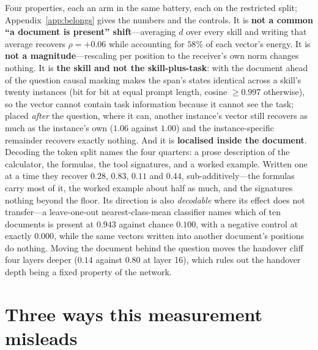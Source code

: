 \documentclass{article}
\newcommand{\dvec}{\ensuremath{d}}
\begin{document}
Four properties, each an arm in the same battery, each on the restricted split;
Appendix~\ref{app:belongs} gives the numbers and the controls. It is
\textbf{not a common ``a document is present'' shift}---averaging $\dvec$ over
every skill and writing that average recovers $\rho=+0.06$ while accounting for
$58\%$ of each vector's energy. It is \textbf{not a magnitude}---rescaling per
position to the receiver's own norm changes nothing. It is \textbf{the skill and
not the skill-plus-task}: with the document ahead of the question causal masking
makes the span's states identical across a skill's twenty instances (bit for bit
at equal prompt length, cosine $\ge 0.997$ otherwise), so the vector cannot contain task
information because it cannot see the task; placed \emph{after} the question,
where it can, another instance's vector still recovers as much as the instance's
own ($1.06$ against $1.00$) and the instance-specific remainder recovers exactly
nothing. And it is \textbf{localised inside the document}. Decoding the token split
names the four quarters: a prose description of the calculator, the formulas,
the tool signatures, and a worked example. Written one at a time they recover
$0.28$, $\mathbf{0.83}$, $0.11$ and $0.44$, sub-additively---the formulas carry
most of it, the worked example about half as much, and the signatures nothing
beyond the floor. Its
direction is also \emph{decodable} where its effect does not transfer---a
leave-one-out nearest-class-mean classifier names which of ten documents is
present at $0.943$ against chance $0.100$, with a negative control at exactly
$0.000$, while the same vectors written into another document's positions do
nothing. Moving the document behind the question moves the handover cliff four
layers deeper ($0.14$ against $0.80$ at layer 16), which rules out the handover
depth being a fixed property of the network.

\section{Three ways this measurement misleads}
\label{sec:traps}
\end{document}

